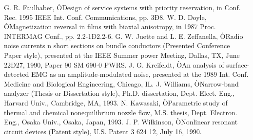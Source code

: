 \documentclass[letterpaper, 10 pt, conference]{ieeeconf}  %
\begin{document}
\begin{thebibliography}{99}
		 G. R. Faulhaber, ÒDesign of service systems with priority reservation, in Conf. Rec. 1995 IEEE Int. Conf. Communications, pp. 3Ð8.
		 W. D. Doyle, ÒMagnetization reversal in films with biaxial anisotropy, in 1987 Proc. INTERMAG Conf., pp. 2.2-1Ð2.2-6.
		 G. W. Juette and L. E. Zeffanella, ÒRadio noise currents n short sections on bundle conductors (Presented Conference Paper style), presented at the IEEE Summer power Meeting, Dallas, TX, June 22Ð27, 1990, Paper 90 SM 690-0 PWRS.
		 J. G. Kreifeldt, ÒAn analysis of surface-detected EMG as an amplitude-modulated noise, presented at the 1989 Int. Conf. Medicine and Biological Engineering, Chicago, IL.
		 J. Williams, ÒNarrow-band analyzer (Thesis or Dissertation style), Ph.D. dissertation, Dept. Elect. Eng., Harvard Univ., Cambridge, MA, 1993. 
		 N. Kawasaki, ÒParametric study of thermal and chemical nonequilibrium nozzle flow, M.S. thesis, Dept. Electron. Eng., Osaka Univ., Osaka, Japan, 1993.
		 J. P. Wilkinson, ÒNonlinear resonant circuit devices (Patent style), U.S. Patent 3 624 12, July 16, 1990. 
		
		
		
		
		
		
	\end{thebibliography}
	
	
	
	
\end{document}
